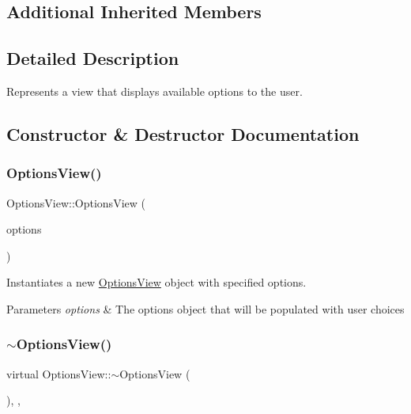 \subsection*{Additional Inherited Members}


\subsection{Detailed Description}
Represents a view that displays available options to the user. 



\subsection{Constructor \& Destructor Documentation}
\mbox{\label{class_options_view_a36369175e23e38e549788ed02076b4f1}} 
\subsubsection{\texorpdfstring{OptionsView()}{OptionsView()}}
{\footnotesize\ttfamily Options\+View\+::\+Options\+View (\begin{DoxyParamCaption}\item[{\mbox{\hyperlink{class_ref}{Ref}}$<$ \mbox{\hyperlink{class_simulation_options}{Simulation\+Options}} $>$}]{options }\end{DoxyParamCaption})}



Instantiates a new \mbox{\hyperlink{class_options_view}{Options\+View}} object with specified options. 


\begin{DoxyParams}{Parameters}
{\em options} & The options object that will be populated with user choices\\
\hline
\end{DoxyParams}
\mbox{\label{class_options_view_a1928636df04508ec0e1f05ca0b2b8706}} 
\subsubsection{\texorpdfstring{$\sim$OptionsView()}{~OptionsView()}}
{\footnotesize\ttfamily virtual Options\+View\+::$\sim$\+Options\+View (\begin{DoxyParamCaption}{ }\end{DoxyParamCaption})\hspace{0.3cm}{\ttfamily [inline]}, {\ttfamily [override]}, {\ttfamily [virtual]}}



